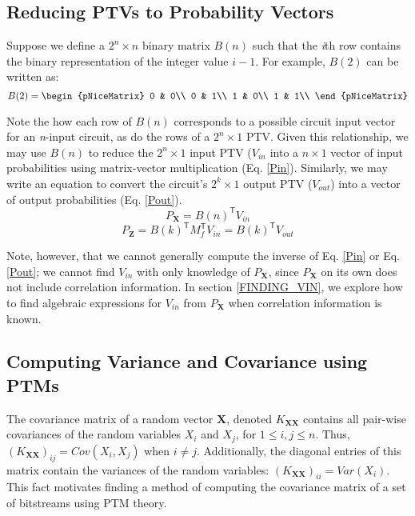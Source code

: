 \documentclass[conference]{IEEEtran}
\begin{document}
\subsection{Reducing PTVs to Probability Vectors}
Suppose we define a $2^n\times n$ binary matrix $B(n)$ such that the \textit{i}th row contains the binary representation of the integer value $i-1$. For example, $B(2)$ can be written as:
\begin{equation}\label{B2}
B(2) = \begin{pNiceMatrix}
0 & 0\\
0 & 1\\
1 & 0\\
1 & 1\\
\end{pNiceMatrix}  
\end{equation}

Note the how each row of $B(n)$ corresponds to a possible circuit input vector for an \textit{n}-input circuit, as do the rows of a $2^n \times 1$ PTV. Given this relationship, we may use $B(n)$ to reduce the $2^n \times 1$ input PTV ($V_{in}$ into a $n \times 1$ vector of input probabilities using matrix-vector multiplication (Eq. \ref{Pin}). Similarly, we may write an equation to convert the circuit's $2^k \times 1$ output PTV ($V_{out}$) into a vector of output probabilities (Eq. \ref{Pout}). 
\begin{equation}\label{Pin}
P_{\mathbf{X}} = B(n)^{\mathsf{T}}V_{in}
\end{equation}
\begin{equation}\label{Pout}
P_{\mathbf{Z}} = B(k)^{\mathsf{T}}M_{f}^{\textsf{T}}V_{in} = B(k)^{\mathsf{T}}V_{out}
\end{equation}

Note, however, that we cannot generally compute the inverse of Eq. \ref{Pin} or Eq. \ref{Pout}; we cannot find $V_{in}$ with only knowledge of $P_{\mathbf{X}}$, since $P_{\mathbf{X}}$ on its own does not include correlation information. In section \ref{FINDING_VIN}, we explore how to find algebraic expressions for $V_{in}$ from $P_{\mathbf{X}}$ when correlation information is known.

\subsection{Computing Variance and Covariance using PTMs}
The covariance matrix of a random vector $\mathbf{X}$, denoted $K_{\mathbf{XX}}$ contains all pair-wise covariances of the random variables $X_i$ and $X_j$, for $1 \leq i, j \leq n$. Thus, $(K_{\mathbf{XX}})_{ij} = Cov(X_i, X_j)$ when $i \neq j$. Additionally, the diagonal entries of this matrix contain the variances of the random variables: $(K_{\mathbf{XX}})_{ii} = Var(X_i)$. This fact motivates finding a method of computing the covariance matrix of a set of bitstreams using PTM theory. 
\end{document}

